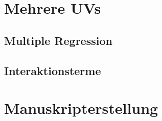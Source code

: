 \documentclass[
]{book}
\begin{document}
\hypertarget{mehrere-uvs}{%
\chapter{Mehrere UVs}\label{mehrere-uvs}}

\hypertarget{multiple-regression}{%
\section{Multiple Regression}\label{multiple-regression}}

\hypertarget{interaktionsterme}{%
\section{Interaktionsterme}\label{interaktionsterme}}

\hypertarget{manuskripterstellung}{%
\chapter{Manuskripterstellung}\label{manuskripterstellung}}

  
\end{document}
